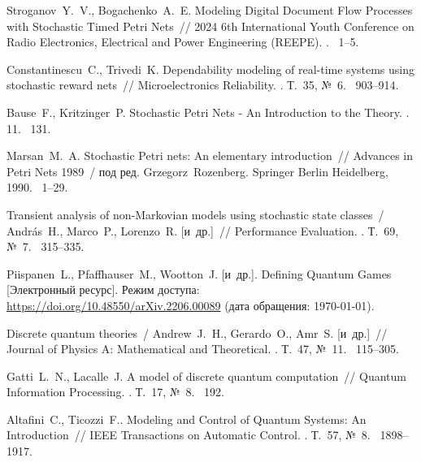 {\par}

\begingroup
\renewcommand{\section}[2]{}
\begin{thebibliography}{}
	Stroganov~Y.~V., Bogachenko~A.~E. Modeling Digital Document Flow
	Processes with Stochastic Timed Petri Nets~// 2024 6th International Youth
	Conference on Radio Electronics, Electrical and Power Engineering (REEPE).
	.
	~1--5.
	
	Constantinescu~C., Trivedi~K. Dependability modeling of real-time
	systems using stochastic reward nets~// Microelectronics Reliability.
	.
	\newblock Т.~35, {№}~6.
	~903--914.
	
	Bause~F., Kritzinger~P. Stochastic Petri Nets - An Introduction to the
	Theory.
	.  11.
	~131.
	
	Marsan~M.~A. Stochastic Petri nets: An elementary introduction~// Advances
	in Petri Nets 1989~/ {под ред. }Grzegorz~Rozenberg.
	\newblock Springer Berlin Heidelberg, 1990.
	~1--29.
	
	Transient analysis of non-Markovian models using stochastic state classes~/
	András~H., Marco~P., Lorenzo~R. {[и~др.]}~// Performance
	Evaluation.
	.
	\newblock Т.~69, {№}~7.
	~315--335.
	
	Piispanen~L., Pfaffhauser~M., Wootton~J. {[и~др.]}. Defining
	Quantum Games [Электронный ресурс].
	\newblock Режим доступа: \url{
		https://doi.org/10.48550/arXiv.2206.00089} (дата
	обращения: \today).
	
	Discrete quantum theories~/ Andrew~J.~H., Gerardo~O., Amr~S.
	{[и~др.]}~// Journal of Physics A: Mathematical and Theoretical.
	.
	\newblock Т.~47, {№}~11.
	~115--305.
	
	Gatti~L.~N., Lacalle~J. A model of discrete quantum computation~//
	Quantum Information Processing.
	.
	\newblock Т.~17, {№}~8.
	~192.
	
	Altafini~C., Ticozzi~F.. Modeling and Control of Quantum Systems:
	An Introduction~// IEEE Transactions on Automatic Control.
	.
	\newblock Т.~57, {№}~8.
	~1898--1917.
	

\end{thebibliography}
